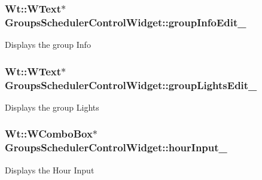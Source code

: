 \subsubsection[{\texorpdfstring{group\+Info\+Edit\+\_\+}{groupInfoEdit_}}]{\setlength{\rightskip}{0pt plus 5cm}Wt\+::\+W\+Text$\ast$ Groups\+Scheduler\+Control\+Widget\+::group\+Info\+Edit\+\_\+\hspace{0.3cm}{\ttfamily [private]}}\hypertarget{classGroupsSchedulerControlWidget_a0827354cfd4577368e24031e767b3e3e}{}\label{classGroupsSchedulerControlWidget_a0827354cfd4577368e24031e767b3e3e}
Displays the group Info 
\subsubsection[{\texorpdfstring{group\+Lights\+Edit\+\_\+}{groupLightsEdit_}}]{\setlength{\rightskip}{0pt plus 5cm}Wt\+::\+W\+Text$\ast$ Groups\+Scheduler\+Control\+Widget\+::group\+Lights\+Edit\+\_\+\hspace{0.3cm}{\ttfamily [private]}}\hypertarget{classGroupsSchedulerControlWidget_aff559cf8e50960c10a424805c8b54c08}{}\label{classGroupsSchedulerControlWidget_aff559cf8e50960c10a424805c8b54c08}
Displays the group Lights 
\subsubsection[{\texorpdfstring{hour\+Input\+\_\+}{hourInput_}}]{\setlength{\rightskip}{0pt plus 5cm}Wt\+::\+W\+Combo\+Box$\ast$ Groups\+Scheduler\+Control\+Widget\+::hour\+Input\+\_\+\hspace{0.3cm}{\ttfamily [private]}}\hypertarget{classGroupsSchedulerControlWidget_ab7d69eede51cc75459ea9b52148d89b3}{}\label{classGroupsSchedulerControlWidget_ab7d69eede51cc75459ea9b52148d89b3}
Displays the Hour Input 
